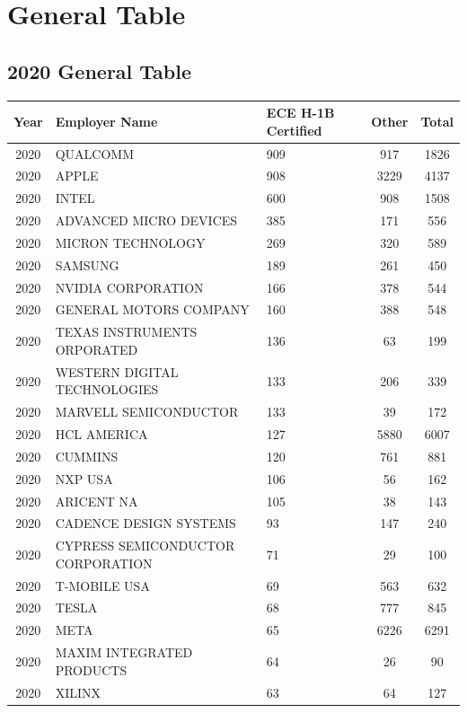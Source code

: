 \documentclass{article}%
\begin{document}
%
\normalsize%
\tableofcontents%
\newpage%
\section{General Table}%
\label{sec:GeneralTable}%
\subsection{2020 General Table}%
\label{subsec:2020GeneralTable}%
\begin{longtable}{c|p{20em}|p{5em}|c|c}%
\hline%
Year&Employer Name&ECE \newline%
 H{-}1B \newline%
 Certified&Other&Total\\%
\hline%
2020&QUALCOMM&909&917&1826\\%
\hline%
2020&APPLE&908&3229&4137\\%
\hline%
2020&INTEL&600&908&1508\\%
\hline%
2020&ADVANCED MICRO DEVICES&385&171&556\\%
\hline%
2020&MICRON TECHNOLOGY&269&320&589\\%
\hline%
2020&SAMSUNG&189&261&450\\%
\hline%
2020&NVIDIA CORPORATION&166&378&544\\%
\hline%
2020&GENERAL MOTORS COMPANY&160&388&548\\%
\hline%
2020&TEXAS INSTRUMENTS ORPORATED&136&63&199\\%
\hline%
2020&WESTERN DIGITAL TECHNOLOGIES&133&206&339\\%
\hline%
2020&MARVELL SEMICONDUCTOR&133&39&172\\%
\hline%
2020&HCL AMERICA&127&5880&6007\\%
\hline%
2020&CUMMINS&120&761&881\\%
\hline%
2020&NXP USA&106&56&162\\%
\hline%
2020&ARICENT NA&105&38&143\\%
\hline%
2020&CADENCE DESIGN SYSTEMS&93&147&240\\%
\hline%
2020&CYPRESS SEMICONDUCTOR CORPORATION&71&29&100\\%
\hline%
2020&T{-}MOBILE USA&69&563&632\\%
\hline%
2020&TESLA&68&777&845\\%
\hline%
2020&META&65&6226&6291\\%
\hline%
2020&MAXIM INTEGRATED PRODUCTS&64&26&90\\%
\hline%
2020&XILINX&63&64&127\\%

\end{longtable}
\end{document}
